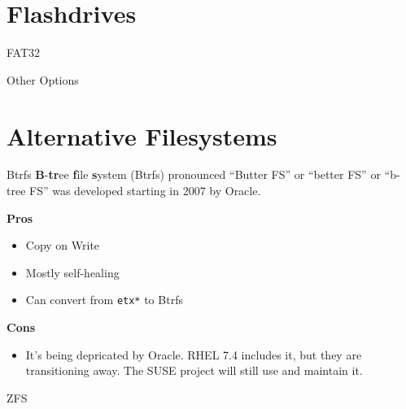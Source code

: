 \documentclass{lug}
\begin{document}
\section{Flashdrives}
\begin{frame}{FAT32}
\end{frame}

\begin{frame}{Other Options}
\end{frame}

\section{Alternative Filesystems}
\begin{frame}{Btrfs}
    \textbf{B}-\textbf{tr}ee \textbf{f}ile \textbf{s}ystem (Btrfs) pronounced
    ``Butter FS'' or ``better FS'' or ``b-tree FS'' was developed starting in
    2007 by Oracle.

    \textbf{Pros}
    \begin{itemize}
        \item Copy on Write
        \item Mostly self-healing
        \item Can convert from \texttt{etx*} to Btrfs
    \end{itemize}

    \textbf{Cons}
    \begin{itemize}
        \item It's being depricated by Oracle. RHEL 7.4 includes it, but they
            are transitioning away. The SUSE project will still use and maintain
            it.
    \end{itemize}
\end{frame}



\begin{frame}{ZFS}
\end{frame}
\end{document}
